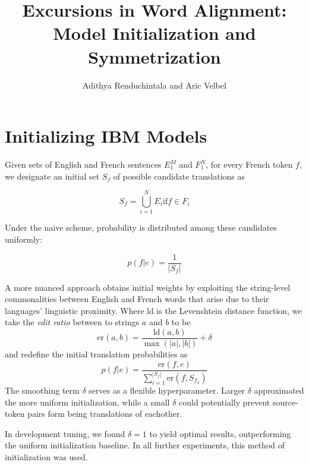 \documentclass{article}
\title{Excursions in Word Alignment: Model Initialization and Symmetrization}
\author{Adithya Renduchintala and Aric Velbel}
\begin{document}
\maketitle


\section{Initializing IBM Models}

Given sets of English and French sentences $E_1^M$ and $F_1^N$, for every French token $f$, we designate an initial set $S_f$ of possible candidate translations as

\[
    S_f = \bigcup_{i=1}^N E_i \text{if} f \in F_i
\]

Under the naive scheme, probability is distributed among these candidates uniformly:

\[
    p(f|e) = \frac{1}{|S_f|}
\]

A more nuanced approach obtains initial weights by exploiting the string-level commonalities between English and French words that arise due to their languages' linguistic proximity. Where ld is the Levenshtein distance function, we take the {\em edit ratio} between to strings $a$ and $b$ to be 
\[
    \text{er}(a,b) = \frac{\text{ld}(a, b)}{\max(|a|, |b|)} + \delta
\]
and redefine the initial translation probabilities as
\[
    p(f|e) = \frac{\text{er}(f,e)}{\sum_{i=1}^{|S_f|} \text{er}(f, {S_f}_i)}
\]
The smoothing term $\delta$ serves as a flexible hyperparameter.  Larger $\delta$ approximated the more uniform initialization, while a small $\delta$ could potentially prevent source-token pairs form being translations of eachother. 

In development tuning, we found $\delta=1$ to yield optimal results, outperforming the uniform initialization baseline. In all further experiments, this method of initialization was used.

\end{document}
